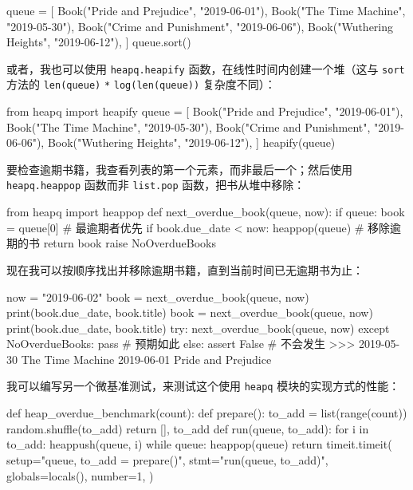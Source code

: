 \begin{codebox}[python]
queue = [
    Book("Pride and Prejudice", "2019-06-01"),
    Book("The Time Machine", "2019-05-30"),
    Book("Crime and Punishment", "2019-06-06"),
    Book("Wuthering Heights", "2019-06-12"),
]
queue.sort()
\end{codebox}

或者，我也可以使用 \texttt{heapq.heapify} 函数，在线性时间内创建一个堆（这与 \texttt{sort} 方法的 \texttt{len(queue)} \texttt{*} \texttt{log(len(queue))} 复杂度不同）：

\begin{codebox}[python]
from heapq import heapify
queue = [
    Book("Pride and Prejudice", "2019-06-01"),
    Book("The Time Machine", "2019-05-30"),
    Book("Crime and Punishment", "2019-06-06"),
    Book("Wuthering Heights", "2019-06-12"),
]
heapify(queue)
\end{codebox}

要检查逾期书籍，我查看列表的第一个元素，而非最后一个；然后使用 \texttt{heapq.heappop} 函数而非 \texttt{list.pop} 函数，把书从堆中移除：

\begin{codebox}[python]
from heapq import heappop
def next_overdue_book(queue, now):
    if queue:
        book = queue[0]     # 最逾期者优先
        if book.due_date < now:
            heappop(queue)  # 移除逾期的书
            return book
    raise NoOverdueBooks
\end{codebox}

现在我可以按顺序找出并移除逾期书籍，直到当前时间已无逾期书为止：

\begin{codebox}[python]
now = "2019-06-02"
book = next_overdue_book(queue, now)
print(book.due_date, book.title)
book = next_overdue_book(queue, now)
print(book.due_date, book.title)
try:
    next_overdue_book(queue, now)
except NoOverdueBooks:
    pass          # 预期如此
else:
    assert False  # 不会发生
>>>
2019-05-30 The Time Machine
2019-06-01 Pride and Prejudice
\end{codebox}

我可以编写另一个微基准测试，来测试这个使用 \texttt{heapq} 模块的实现方式的性能：

\begin{codebox}[python]
def heap_overdue_benchmark(count):
    def prepare():
        to_add = list(range(count))
        random.shuffle(to_add)
        return [], to_add
    def run(queue, to_add):
        for i in to_add:
            heappush(queue, i)
        while queue:
            heappop(queue)
    return timeit.timeit(
        setup="queue, to_add = prepare()",
        stmt="run(queue, to_add)",
        globals=locals(),
        number=1,
    )
\end{codebox}


